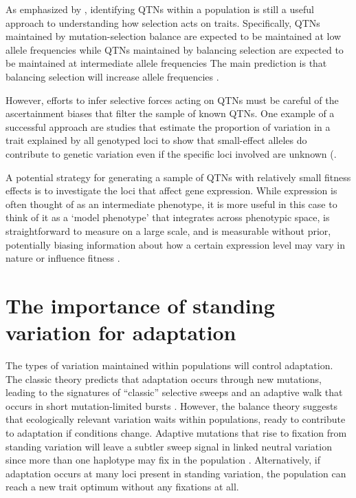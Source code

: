 As emphasized by \citep{Lee2014-pi}, identifying QTNs within a population is still a useful approach to understanding how selection acts on traits. Specifically, QTNs maintained by mutation-selection balance are expected to be maintained at low allele frequencies while QTNs maintained by balancing selection are expected to be maintained at intermediate allele frequencies The main prediction is that balancing selection will increase allele frequencies \citep{Barton2002-do}. 

However, efforts to infer selective forces acting on QTNs must be careful of the ascertainment biases that filter the sample of known QTNs. One example of a successful approach are studies that estimate the proportion of variation in a trait explained by all genotyped loci to show that small-effect alleles do contribute to genetic variation even if the specific loci involved are unknown (\citep{Yang2010-iu,International_Schizophrenia_Consortium2009-ks}.

A potential strategy for generating a sample of QTNs with relatively small fitness effects is to investigate the loci that affect gene expression. While expression is often thought of as an intermediate phenotype, it is more useful in this case to think of it as a ‘model phenotype’ that integrates across phenotypic space, is straightforward to measure on a large scale, and is measurable without prior, potentially biasing information about how a certain expression level may vary in nature or influence fitness \citep{Rockman2006-yx}.

\section{The importance of standing variation for adaptation}

The types of variation maintained within populations will control adaptation. The classic theory predicts that adaptation occurs through new mutations, leading to the signatures of “classic” selective sweeps and an adaptive walk that occurs in short mutation-limited bursts \citep{Smith1974-kf,Allen_Orr2005-fs,Fisher1930-el}. However, the balance theory suggests that ecologically relevant variation waits within populations, ready to contribute to adaptation if conditions change. Adaptive mutations that rise to fixation from standing variation will leave a subtler sweep signal in linked neutral variation since more than one haplotype may fix in the population \citep{Pennings2006-bm,Hermisson2005-ag}. Alternatively, if adaptation occurs at many loci present in standing variation, the population can reach a new trait optimum without any fixations at all\citep{Pritchard2010-uh,Pritchard2010-uq}.

